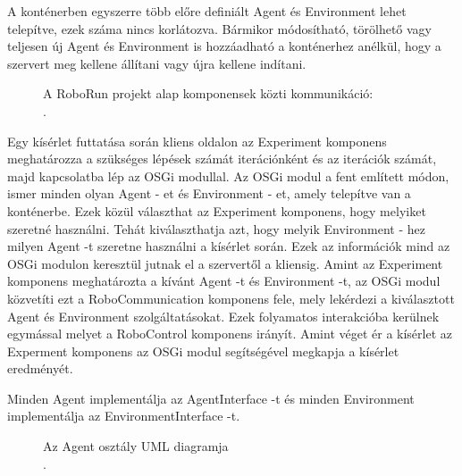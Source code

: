 	 A konténerben egyszerre több előre definiált Agent és Environment lehet telepítve, ezek száma nincs korlátozva. Bármikor módosítható, törölhető vagy teljesen új Agent és Environment is hozzáadható a konténerhez anélkül, hogy a szervert meg kellene állítani vagy újra kellene indítani.

\begin{figure}[t]
  \centering
  \caption[Példa képek beszúrására]%
  {A RoboRun projekt alap komponensek közti kommunikáció:\\
  {\white .}\hfill\url{}}
  \label{fig:ALAP:sm1}
\end{figure}

Egy kísérlet futtatása során kliens oldalon az Experiment komponens meghatározza a szükséges lépések számát iterációnként és az iterációk számát, majd kapcsolatba lép az OSGi modullal. Az OSGi modul a fent említett módon, ismer minden olyan Agent - et és Environment - et, amely telepítve van a konténerbe. Ezek közül választhat az Experiment komponens, hogy melyiket szeretné használni. Tehát kiválaszthatja azt, hogy melyik Environment - hez milyen Agent -t szeretne használni a kísérlet során. Ezek az információk mind az OSGi modulon keresztül jutnak el a szervertől a kliensig. Amint az Experiment komponens meghatározta a kívánt Agent -t és Environment -t, az OSGi modul közvetíti ezt a RoboCommunication komponens fele, mely lekérdezi a kiválasztott Agent és Environment szolgáltatásokat. Ezek folyamatos interakcióba kerülnek egymással melyet a RoboControl komponens irányít. Amint véget ér a kísérlet az Experment komponens az OSGi modul segítségével megkapja a kísérlet eredményét.

	Minden Agent implementálja az AgentInterface -t és minden Environment implementálja az EnvironmentInterface -t. 

\begin{figure}[t]
  \centering
  \caption[Példa képek beszúrására]%
  {Az Agent osztály UML diagramja\\
  {\white .}\hfill\url{}}
  \label{fig:ALAP:sm1}
\end{figure}


